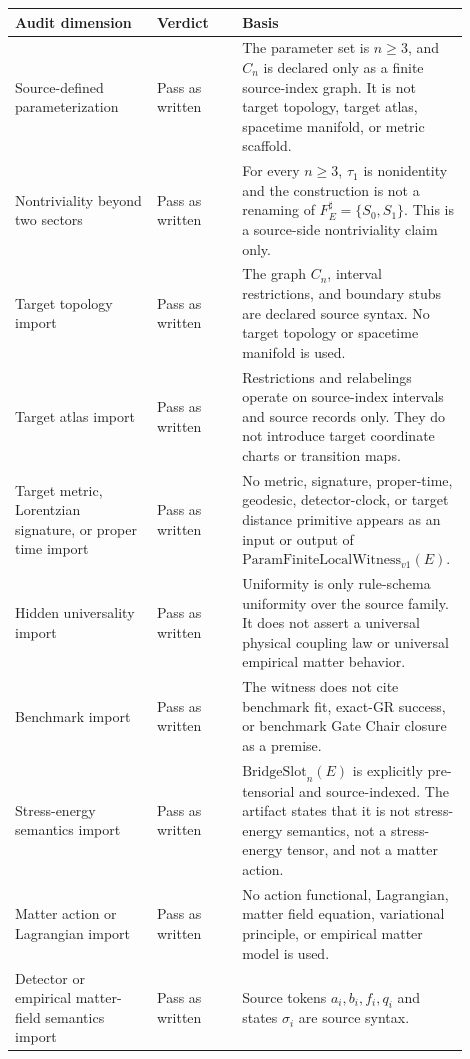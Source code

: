 \documentclass[11pt]{article}
\newcommand{\PFLFW}{\mathrm{ParamFiniteLocalWitness}_{v1}}
\newcommand{\BridgeSlot}{\mathrm{BridgeSlot}}
\begin{document}
\begin{longtable}{p{0.30\linewidth}p{0.18\linewidth}p{0.42\linewidth}}
\toprule
Audit dimension & Verdict & Basis \\
\midrule
Source-defined parameterization &
Pass as written &
The parameter set is \(n\ge 3\), and \(C_n\) is declared only as a finite
source-index graph. It is not target topology, target atlas, spacetime
manifold, or metric scaffold. \\
\addlinespace
Nontriviality beyond two sectors &
Pass as written &
For every \(n\ge 3\), \(\tau_1\) is nonidentity and the construction is not a
renaming of \(F_E^\sharp=\{S_0,S_1\}\). This is a source-side nontriviality
claim only. \\
\addlinespace
Target topology import &
Pass as written &
The graph \(C_n\), interval restrictions, and boundary stubs are declared
source syntax. No target topology or spacetime manifold is used. \\
\addlinespace
Target atlas import &
Pass as written &
Restrictions and relabelings operate on source-index intervals and source
records only. They do not introduce target coordinate charts or transition
maps. \\
\addlinespace
Target metric, Lorentzian signature, or proper time import &
Pass as written &
No metric, signature, proper-time, geodesic, detector-clock, or target
distance primitive appears as an input or output of \(\PFLFW(E)\). \\
\addlinespace
Hidden universality import &
Pass as written &
Uniformity is only rule-schema uniformity over the source family. It does not
assert a universal physical coupling law or universal empirical matter
behavior. \\
\addlinespace
Benchmark import &
Pass as written &
The witness does not cite benchmark fit, exact-GR success, or benchmark Gate
Chair closure as a premise. \\
\addlinespace
Stress-energy semantics import &
Pass as written &
\(\BridgeSlot_n(E)\) is explicitly pre-tensorial and source-indexed. The
artifact states that it is not stress-energy semantics, not a stress-energy
tensor, and not a matter action. \\
\addlinespace
Matter action or Lagrangian import &
Pass as written &
No action functional, Lagrangian, matter field equation, variational
principle, or empirical matter model is used. \\
\addlinespace
Detector or empirical matter-field semantics import &
Pass as written &
Source tokens \(a_i,b_i,f_i,q_i\) and states \(\sigma_i\) are source syntax.

\end{longtable}
\end{document}
